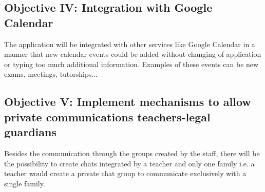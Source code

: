 \subsection{Objective IV: Integration with Google Calendar}
The application will be integrated with other services like Google Calendar in a \mbox{manner} that new calendar events could be added without changing of application or typing too much additional information. Examples of these events can be new exams, meetings, \mbox{tutorships}...

\clearpage

\subsection{Objective V: Implement mechanisms to allow private communications teachers-legal guardians}
Besides the communication through the groups created by the staff, there will be the possibility to create chats integrated by a teacher and only one family i.e. a teacher would create a private chat group to communicate exclusively with a single family.

